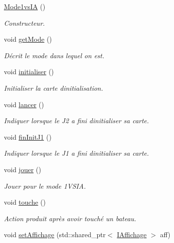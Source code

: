 \begin{DoxyCompactItemize}
\item 
\hyperlink{class_mode1vs_i_a_af8c73f16906279a89df6e9d150dfb1a2}{Mode1vs\+IA} ()
\begin{DoxyCompactList}\small\item\em Constructeur. \end{DoxyCompactList}\item 
void \hyperlink{class_mode1vs_i_a_a8853a5c4bd43685f2232929f9d9d8732}{get\+Mode} ()
\begin{DoxyCompactList}\small\item\em Décrit le mode dans lequel on est. \end{DoxyCompactList}\item 
void \hyperlink{class_mode1vs_i_a_a2e92031d0b7626da4f87ecc856a4ae94}{initialiser} ()
\begin{DoxyCompactList}\small\item\em Initialiser la carte d\textquotesingle{}initialisation. \end{DoxyCompactList}\item 
void \hyperlink{class_mode1vs_i_a_ab6aa884defaf26231ede82d689b80d60}{lancer} ()
\begin{DoxyCompactList}\small\item\em Indiquer lorsque le J2 a fini d\textquotesingle{}initialiser sa carte. \end{DoxyCompactList}\item 
void \hyperlink{class_mode1vs_i_a_ab50fb645a214d5cfab5fdb7a2b98673c}{fin\+Init\+J1} ()
\begin{DoxyCompactList}\small\item\em Indiquer lorsque le J1 a fini d\textquotesingle{}initialiser sa carte. \end{DoxyCompactList}\item 
void \hyperlink{class_mode1vs_i_a_a7f7ab3fae5995ab12d6ce508c3d7dbca}{jouer} ()
\begin{DoxyCompactList}\small\item\em Jouer pour le mode 1\+V\+S\+IA. \end{DoxyCompactList}\item 
void \hyperlink{class_mode1vs_i_a_a1da5810e6d744e2cbeae3ceebe6df521}{touche} ()
\begin{DoxyCompactList}\small\item\em Action produit après avoir touché un bateau. \end{DoxyCompactList}\item 
void \hyperlink{class_mode1vs_i_a_a6c4e65dc4d95046165ce46b01cee6fad}{set\+Affichage} (std\+::shared\+\_\+ptr$<$ \hyperlink{class_i_affichage}{I\+Affichage} $>$ aff)

\end{DoxyCompactItemize}
